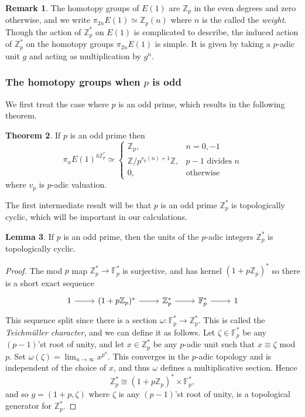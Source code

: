 \documentclass[a4paper]{article} %
\theoremstyle{definition}
\newtheorem{theorem}{Theorem} %
\newtheorem{lemma}[theorem]{Lemma}
\newtheorem{remark}[theorem]{Remark}
\newcommand{\Z}{\mathbb{Z}}
\newcommand{\F}{\mathbb{F}}
\begin{document}
\begin{remark}
  The homotopy groups of $E(1)$ are $\Z_p$ in the even degrees and zero otherwise, and we write $\pi_{2n}E(1) \simeq \Z_p(n)$ where $n$ is the called the \textit{weight}. Though the action of $\Z_p^*$ on $E(1)$ is complicated to describe, the induced action of $\Z_p^*$ on the homotopy groups $\pi_{2n}E(1)$ is simple. It is given by taking a $p$-adic unit $g$ and acting as multiplication by $g^n$.
\end{remark}

\subsubsection{The homotopy groups when $p$ is odd}

We first treat the case where $p$ is an odd prime, which results in the following theorem.
\begin{theorem}
 If $p$ is an odd prime then
 \[
  \pi_n E(1)^{h\Z_p^*} \simeq
    \begin{cases}
    \Z_p, & n=0,-1 \\
    \Z/p^{v_p(n)+1}\Z, & p-1 \text{ divides } n \\
    0, & \text{otherwise}
    \end{cases}
  \]
  where $v_p$ is $p$-adic valuation.
\end{theorem}
The first intermediate result will be that $p$ is an odd prime $\Z_p^*$ is topologically cyclic, which will be important in our calculations.
\begin{lemma}
  If $p$ is an odd prime, then the units of the $p$-adic integers $\Z_p^*$ is topologically cyclic.
\end{lemma}
\begin{proof}
The mod $p$ map $\Z_p^* \to \F_p^*$ is surjective, and has kernel $(1+p\Z_p)^*$ so there is a short exact sequence
\[
\begin{tikzcd}
1 \rar & (1+p\Z_p)^* \rar{} & \Z_p^* \rar{} & \F_p^* \rar & 1
\end{tikzcd}
\]
This sequence split since there is a section $\omega \colon \F_p^* \to \Z_p^*$. This is called the \textit{Teichmüller character}, and we can define it as follows. Let $\zeta \in \F_p^*$ be any $(p-1)$'st root of unity, and let $x \in \Z_p^*$ be any $p$-adic unit such that $x \equiv \zeta$ mod $p$. Set $\omega(\zeta) = \lim_{n \to \infty} x^{p^n}$. This converges in the $p$-adic topology and is independent of the choice of $x$,
and thus $\omega$ defines a multiplicative section. Hence
\[
\Z_p^* \cong (1 + p\Z_p)^* \times \F_p^*,
\]
and so $g = (1+p, \zeta)$ where $\zeta$ is any $(p-1)$'st root of unity, is a topological generator for $\Z_p^*$.
\end{proof}
\end{document}
